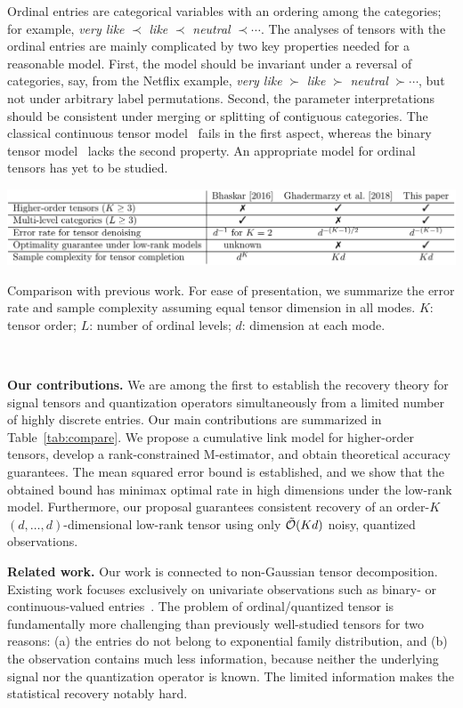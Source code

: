 \documentclass{article}
\theoremstyle{plain}
\theoremstyle{definition}
\begin{document}
Ordinal entries are categorical variables with an ordering among the categories; for example, {\it very like} $\prec$ {\it like} $\prec$ {\it neutral} $\prec \cdots$. The analyses of tensors with the ordinal entries are mainly complicated by two key properties needed for a reasonable model. First, the model should be invariant under a reversal of categories, say, from the Netflix example, {\it very like} $\succ$ {\it like} $\succ$ {\it neutral} $\succ \cdots$, but not under arbitrary label permutations. Second, the parameter interpretations should be consistent under merging or splitting of contiguous categories. The classical continuous tensor model~\cite{kolda2009tensor, ghadermarzy2019near} fails in the first aspect, whereas the binary tensor model~\cite{ghadermarzy2018learning} lacks the second property. An appropriate model for ordinal tensors has yet to be studied.

\begin{table}[ht]
\centerline{\includegraphics[width=1\textwidth]{compare.pdf}}
\vspace{-.3cm}
\caption{Comparison with previous work. For ease of presentation, we summarize the error rate and sample complexity assuming equal tensor dimension in all modes. $K$: tensor order; $L$: number of ordinal levels; $d$: dimension at each mode. }~\label{tab:compare}
\vspace{-.7cm}
\end{table}

{\bf Our contributions.} We are among the first to establish the recovery theory for signal tensors and quantization operators simultaneously from a limited number of highly discrete entries. Our main contributions are summarized in Table~\ref{tab:compare}. We propose a cumulative link model for higher-order tensors, develop a rank-constrained M-estimator, and obtain theoretical accuracy guarantees. The mean squared error bound is established, and we show that the obtained bound has minimax optimal rate in high dimensions under the low-rank model. Furthermore, our proposal guarantees consistent recovery of an order-$K$ $(d,\ldots,d)$-dimensional low-rank tensor using only $\tilde {\mathcal{O}}(Kd)$ noisy, quantized observations.

{\bf Related work.} Our work is connected to non-Gaussian tensor decomposition. Existing work focuses exclusively on univariate observations such as binary- or continuous-valued entries~\citep{wang2018learning,ghadermarzy2018learning}.  The problem of ordinal/quantized tensor is fundamentally more challenging than previously well-studied tensors for two reasons: (a) the entries do not belong to exponential family distribution, and (b) the observation contains much less information, because neither the underlying signal nor the quantization operator is known. The limited information makes the statistical recovery notably hard.
\end{document}
